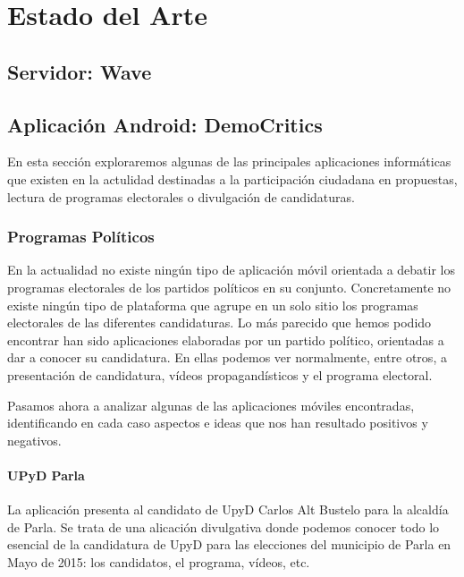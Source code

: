 \newpage
\thispagestyle{sectioned}
\chapter{Estado del Arte}

\section{Servidor: Wave}

\section{Aplicación Android: DemoCritics}

En esta sección exploraremos algunas de las principales aplicaciones informáticas que existen en la actulidad destinadas a la participación ciudadana en propuestas, lectura de programas electorales o divulgación de candidaturas.

\subsection{Programas Políticos}

En la actualidad no existe ningún tipo de aplicación móvil orientada a debatir los programas electorales de los partidos políticos en su conjunto. Concretamente no existe ningún tipo de plataforma que agrupe en un solo sitio los programas electorales de las diferentes candidaturas.
Lo más parecido que hemos podido encontrar han sido aplicaciones elaboradas por un partido político, orientadas a dar a conocer su candidatura. En ellas podemos ver normalmente, entre otros, a presentación de candidatura, vídeos propagandísticos y el programa electoral. 

Pasamos ahora a analizar algunas de las aplicaciones móviles encontradas, identificando en cada caso aspectos e ideas que nos han resultado positivos y negativos.

\subsubsection{UPyD Parla}
La aplicación presenta al candidato de UpyD Carlos Alt Bustelo para la alcaldía de Parla. Se trata de una alicación divulgativa donde podemos conocer todo lo esencial de la candidatura de UpyD para las elecciones del municipio de Parla en Mayo de 2015: los candidatos, el programa, vídeos, etc.


